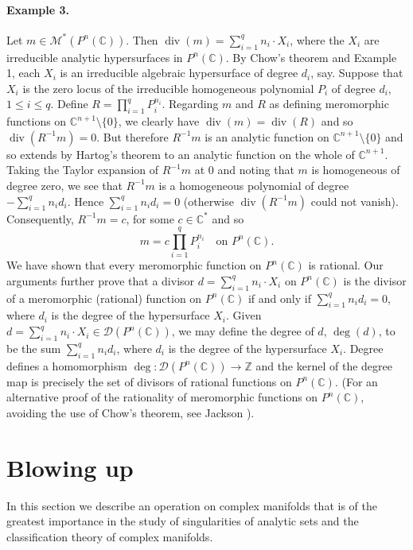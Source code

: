 \paragraph*{Example 3.} Let $m\in\mathcal M^*(P^n(\mathbb C))$. Then $\operatorname{div}(m)=\sum_{i=1}^qn_i\cdot X_i$, where the $X_i$ are irreducible analytic hypersurfaces in $P^n(\mathbb C)$. By Chow's theorem and Example 1, each $X_i$ is an irreducible algebraic hypersurface of degree $d_i$, say. Suppose that $X_i$ is the zero locus of the irreducible homogeneous polynomial $P_i$ of degree $d_i$, $1\leq i\leq q$. Define $R=\prod_{i=1}^qP_i^{n_i}$. Regarding $m$ and $R$ as defining meromorphic functions on $\mathbb C^{n+1}\setminus\{0\}$, we clearly have $\operatorname{div}(m)=\operatorname{div}(R)$ and so $\operatorname{div}(R^{-1}m)=0$. But therefore $R^{-1}m$ is an analytic function on $\mathbb C^{n+1}\setminus\{0\}$ and so extends by Hartog's theorem to an analytic function on the whole of $\mathbb C^{n+1}$. Taking the Taylor expansion of $R^{-1}m$ at 0 and noting that $m$ is homogeneous of degree zero, we see that $R^{-1}m$ is a homogeneous polynomial of degree $-\sum_{i=1}^qn_id_i$. Hence $\sum_{i=1}^qn_id_i=0$
(otherwise $\operatorname{div}(R^{-1}m)$ could not vanish). Consequently, $R^{-1}m=c$, for some $c\in\mathbb C^*$ and so
\[
m=c\prod_{i=1}^qP_i^{n_i}\quad\text{on }P^n(\mathbb C).
\]
We have shown that every meromorphic function on $P^n(\mathbb C)$ is rational. Our arguments further prove that a divisor $d=\sum_{i=1}^qn_i\cdot X_i$ on $P^n(\mathbb C)$ is the divisor of a meromorphic (rational) function on $P^n(\mathbb C)$ if and only if $\sum_{i=1}^qn_id_i=0$, where $d_i$ is the degree of the hypersurface $X_i$. Given $d=\sum_{i=1}^qn_i\cdot X_i\in\mathcal D(P^n(\mathbb C))$, we may define the degree of $d$, $\deg(d)$, to be the sum $\sum_{i=1}^qn_id_i$, where $d_i$ is the degree of the hypersurface $X_i$. Degree defines a homomorphism $\deg:\mathcal D(P^n(\mathbb C))\longrightarrow\mathbb Z$ and the kernel of the degree map is precisely the set of divisors of rational functions on $P^n(\mathbb C)$. (For an alternative proof of the rationality of meromorphic functions on $P^n(\mathbb C)$, avoiding the use of Chow's theorem, see Jackson \cite{bib:I:jackson-d:1}).

\section{Blowing up}\label{sec:4:7}
In this section we describe an operation on complex manifolds that is of the greatest importance in the study of singularities of analytic sets and the classification theory of complex manifolds.

